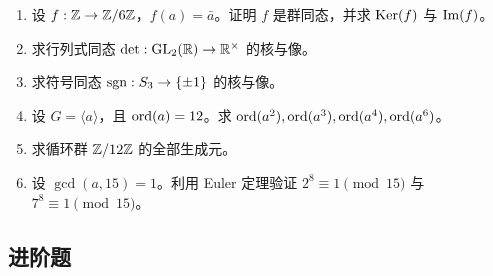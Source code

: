 \begin{enumerate}[label=\textbf{习题6.\arabic*.}, leftmargin=7em]
  \item \basic 设 $f:\mathbb{Z}\to \mathbb{Z}/6\mathbb{Z}$，$f(a)=\bar a$。证明 $f$ 是群同态，并求 $\mathrm{Ker}(f)$ 与 $\mathrm{Im}(f)$。
  \item \basic 求行列式同态 $\det:\mathrm{GL}_2(\mathbb{R})\to \mathbb{R}^\times$ 的核与像。
  \item \basic 求符号同态 $\operatorname{sgn}:S_3\to \{\pm1\}$ 的核与像。
  \item \basic 设 $G=\langle a \rangle$，且 $\mathrm{ord}(a)=12$。求 $\mathrm{ord}(a^2),\mathrm{ord}(a^3),\mathrm{ord}(a^4),\mathrm{ord}(a^6)$。
  \item \basic 求循环群 $\mathbb{Z}/12\mathbb{Z}$ 的全部生成元。
  \item \basic 设 $\gcd(a,15)=1$。利用 Euler 定理验证 $2^8 \equiv1 \pmod{15}$ 与 $7^8 \equiv1 \pmod{15}$。
\end{enumerate}

\subsection*{进阶题}

